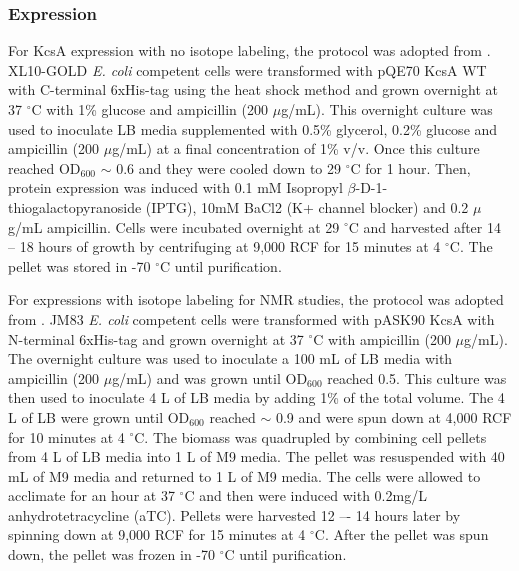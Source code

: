 \subsubsection{Expression}
For KcsA expression with no isotope labeling, the protocol was adopted from \citep{tilegenova2016}. XL10-GOLD \textit{E. coli} competent cells were transformed with pQE70 KcsA WT with C-terminal 6xHis-tag using the heat shock method and grown overnight at 37 $^{\circ}$C with 1\% glucose and ampicillin (200 $\mu$g/mL). This overnight culture was used to inoculate LB media supplemented with 0.5\% glycerol, 0.2\% glucose and ampicillin (200 $\mu$g/mL) at a final concentration of 1\% v/v. Once this culture reached OD$_{600}$ $\sim$ 0.6 and they were cooled down to 29 $^{\circ}$C for 1 hour. Then, protein expression was induced with 0.1 mM Isopropyl $\beta$-D-1-thiogalactopyranoside (IPTG), 10mM BaCl2 (K+ channel blocker) and 0.2 $\mu$g/mL ampicillin. Cells were incubated overnight at 29 $^{\circ}$C and harvested after 14 -- 18 hours of growth by centrifuging at 9,000 RCF for 15 minutes at 4 $^{\circ}$C. The pellet was stored in -70 $^{\circ}$C until purification.

For expressions with isotope labeling for NMR studies, the protocol was adopted from \citep{bhate2013}. JM83 \textit{E. coli} competent cells were transformed with pASK90 KcsA with N-terminal 6xHis-tag and grown overnight at 37 $^{\circ}$C with ampicillin (200 $\mu$g/mL). The overnight culture was used to inoculate a 100 mL of LB media with ampicillin (200 $\mu$g/mL) and was grown until OD$_{600}$ reached 0.5. This culture was then used to inoculate 4 L of LB media by adding 1\% of the total volume. The 4 L of LB were grown until OD$_{600}$ reached $\sim$ 0.9 and were spun down at 4,000 RCF for 10 minutes at 4 $^{\circ}$C. The biomass was quadrupled by combining cell pellets from 4 L of LB media into 1 L of M9 media. The pellet was resuspended with 40 mL of M9 media and returned to 1 L of M9 media. The cells were allowed to acclimate for an hour at 37 $^{\circ}$C and then were induced with 0.2mg/L anhydrotetracycline (aTC). Pellets were harvested 12 –- 14 hours later by spinning down at 9,000 RCF for 15 minutes at 4 $^{\circ}$C. After the pellet was spun down, the pellet was frozen in -70 $^{\circ}$C until purification. 


